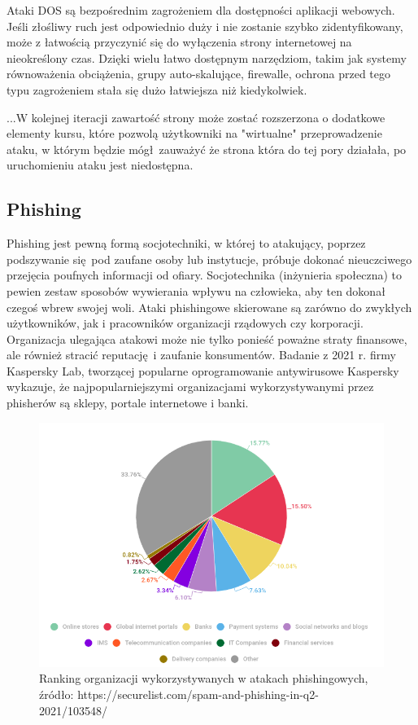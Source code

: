 \documentclass[12pt,twoside]{article}
\begin{document}
Ataki DOS są bezpośrednim zagrożeniem dla dostępności aplikacji webowych. Jeśli złośliwy ruch jest odpowiednio duży i nie zostanie szybko zidentyfikowany, może z łatwością przyczynić się do wyłączenia strony internetowej na nieokreślony czas. Dzięki wielu łatwo dostępnym narzędziom, takim jak systemy równoważenia obciążenia, grupy auto-skalujące, firewalle, ochrona przed tego typu zagrożeniem stała się dużo łatwiejsza niż kiedykolwiek.

...W kolejnej iteracji zawartość strony może zostać rozszerzona o dodatkowe elementy kursu, które pozwolą użytkowniki na "wirtualne" przeprowadzenie ataku, w którym będzie mógł zauważyć że strona która do tej pory działała, po uruchomieniu ataku jest niedostępna. 
\clearpage

\subsection{Phishing}
Phishing jest pewną formą socjotechniki, w której to atakujący, poprzez podszywanie się pod zaufane osoby lub instytucje, próbuje dokonać nieuczciwego przejęcia poufnych informacji od ofiary. Socjotechnika (inżynieria społeczna) to pewien zestaw sposobów wywierania wpływu na człowieka, aby ten dokonał czegoś wbrew swojej woli. Ataki phishingowe skierowane są zarówno do zwykłych użytkowników, jak i pracowników organizacji rządowych czy korporacji. Organizacja ulegająca atakowi może nie tylko ponieść poważne straty finansowe, ale również stracić reputację i zaufanie konsumentów. Badanie z 2021 r. firmy Kaspersky Lab, tworzącej popularne oprogramowanie antywirusowe Kaspersky wykazuje, że najpopularniejszymi organizacjami wykorzystywanymi przez phisherów są sklepy, portale internetowe i banki.  \cite{PhishingChart}	

\begin{figure}[H]
	\centering
	\includegraphics[width=0.9\linewidth]{figures/phishing-organisations}
	\caption{Ranking organizacji wykorzystywanych w atakach phishingowych, źródło: https://securelist.com/spam-and-phishing-in-q2-2021/103548/}
	\label{fig:phishing-organisations}
\end{figure}
\end{document}
